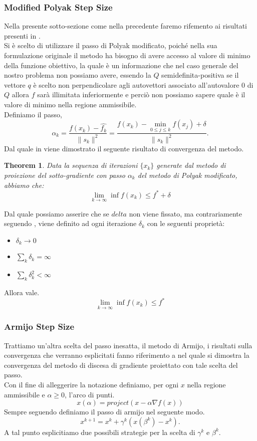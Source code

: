\documentclass{article}
\newtheorem{theorem}{Theorem}[section]
\begin{document}
\subsubsection{Modified Polyak Step Size}
Nella presente sotto-sezione come nella precedente faremo rifemento ai risultati presenti in \cite{sgd_notes}.\\
Si è scelto di utilizzare il passo di Polyak modificato, poiché nella sua formulazione originale il metodo ha bisogno di avere accesso al valore di minimo della funzione obiettivo, la quale è un informazione che nel caso generale del nostro problema non possiamo avere, essendo la $Q$ semidefinita-positiva se il vettore $q$ è scelto non perpendicolare agli autovettori associato all'autovalore 0 di $Q$ allora $f$ sarà illimitata inferiormente e perciò non possiamo sapere quale è il valore di minimo nella regione ammissibile.\\
Definiamo il passo,
\[\alpha_k = \frac{f(x_k) - \hat{f_k}}{\|s_k\|^2} = \frac{f(x_k) - \min_{0 \leq j \leq k} f(x_j) + \delta}{\|s_k\|^2}.\]
Dal quale in \cite{sgd_notes} viene dimostrato il seguente risultato di convergenza del metodo.
\begin{theorem}
Data la sequenza di iterazioni $\{x_k\}$ generate dal metodo di proiezione del sotto-gradiente con passo $\alpha_k$ del metodo di Polyak modificato, abbiamo che:
\[\lim_{k \to \infty} \inf f(x_k) \leq f^* + \delta\]
\end{theorem}
Dal quale possiamo asserire che se $delta$ non viene fissato, ma contrariamente seguendo \cite{subgrad_method_slides}, viene definito ad ogni iterazione $\delta_k$ con le seguenti proprietà:\\
\begin{itemize}
    \item $\delta_k \to 0$
    \item $\sum_k \delta_k = \infty$
    \item $\sum_k \delta_k^2 < \infty$
\end{itemize}
Allora vale.
\[\lim_{k \to \infty} \inf f(x_k) \leq f^*\]
\subsubsection{Armijo Step Size}
Trattiamo un'altra scelta del passo inesatta, il metodo di Armijo, i risultati sulla convergenza che verranno esplicitati fanno riferimento a \cite{gafni1982convergence} nel quale si dimostra la convergenza del metodo di discesa di gradiente proiettato con tale scelta del passo.\\
Con il fine di alleggerire la notazione definiamo, per ogni $x$ nella regione ammissibile e $\alpha \geq 0$, l'arco di punti.
\[x(\alpha) = project(x - \alpha \nabla f(x))\]
Sempre seguendo \cite{gafni1982convergence} definiamo il passo di armijo nel seguente modo.
\[x^{k+1} = x^k + \gamma^k (x(\beta^k) - x^k).\]
A tal punto esplicitiamo due possibili strategie per la scelta di $\gamma^k$ e $\beta^k$.\\
\end{document}
